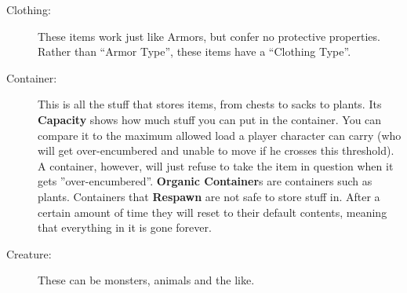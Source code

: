 \begin{description}
 \item[Clothing:] These items work just like Armors, but confer no protective properties. Rather than ``Armor Type'', these items have a ``Clothing Type''.
 \item[Container:] This is all the stuff that stores items, from chests to sacks to plants. Its \textbf{Capacity} shows how much stuff you can put in the container. You can compare it to the maximum allowed load a player character can carry (who will get over-encumbered and unable to move if he crosses this threshold). A container, however, will just refuse to take the item in question when it gets ''over-encumbered''. \textbf{Organic Container}s are containers such as plants. Containers that \textbf{Respawn} are not safe to store stuff in. After a certain amount of time they will reset to their default contents, meaning that everything in it is gone forever.
 \item[Creature:] These can be monsters, animals and the like. 
 
\end{description}
